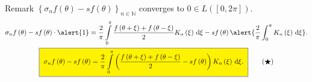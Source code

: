 \begin{frame}
\begin{block}{Remark}
\begin{math}
			{
				\left\{
				\sigma_{n}f\left(\theta\right)-
				sf\left(\theta\right)
				\right\}
			}_{n\in\mathds{N}}
		\end{math}
		converges to $0\in L\left(\left[0,2\pi\right]\right)$.
		\begin{gather}
			\sigma_{n}f\left(\theta\right)-
			sf\left(\theta\right)\cdot\alert{1}=
			\frac{2}{\pi}
			\int\limits_{0}^{\pi}
			\frac{
				f\left(\theta+\xi\right)+
				f\left(\theta-\xi\right)
			}{2}
			K_{n}\left(\xi\right)
			\dl\xi
			-
			sf\left(\theta\right)
			\alert{
				\frac{2}{\pi}
				\int_{0}^{\pi}
				K_{n}\left(\xi\right)
				{\dl\xi}
			}.\notag                                \\
			\fcolorbox{DarkBlue}{yellow}{
				\begin{math}
					\displaystyle
					\sigma_{n}f\left(\theta\right)-
					sf\left(\theta\right)
					=
					\frac{2}{\pi}
					\int\limits_{0}^{\pi}
					\left(
					\frac{
							f\left(\theta+\xi\right)+
							f\left(\theta-\xi\right)
						}{2}-sf\left(\theta\right)
					\right)
					K_{n}\left(\xi\right)
					\dl\xi.
				\end{math}
			}\label{eq:mean-difference}\tag{$\bigstar$}
		\end{gather}
	\end{block}
\end{frame}